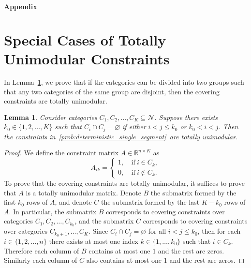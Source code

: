 \documentclass[msom,non-blindrev]{informs3} %
\newtheorem{lemma}[theorem]{Lemma}
\theoremstyle{definition}
\begin{document}

{


%

}

\newpage
\begin{appendices}{\Large \noindent\textbf{Appendix}}

\section{Special Cases of Totally Unimodular Constraints}\label{sec:tu_constraints}

In Lemma~\ref{lemma:tu_constraints}, we prove that if the categories can be divided into two groups such  that any two categories of the same group are disjoint, then the covering constraints are totally unimodular.

\begin{lemma}\label{lemma:tu_constraints}
Consider categories $C_1,C_2,\dots,C_K\subseteq\mathcal{N}$. Suppose there exists $k_0\in\{1,2,\dots,K\}$ such that $C_i\cap C_j=\varnothing$ if either $i<j\leq k_0$ or $k_0<i<j$. Then the constraints in~\eqref{prob:deterministic_single_segment}~are totally unimodular.
\end{lemma}

\begin{proof}
We define the constraint matrix $A\in\mathbb{R}^{n\times K}$ as
\begin{equation*}
A_{ik}=\begin{cases}
1,\ &\text{if}\ i\in C_k,\\
0,\ &\text{if}\ i\notin C_k.
\end{cases}
\end{equation*}
To prove that the covering constraints are totally unimodular, it suffices to prove that $A$ is a totally unimodular matrix. Denote $B$ the submatrix formed by the first $k_0$ rows of $A$, and denote $C$ the submatrix formed by the last $K-k_0$ rows of $A$. In particular, the submatrix $B$ corresponds to covering constraints over categories $C_1,C_2,\dots,C_{k_0}$, and the submatrix $C$ corresponds to covering constraints over categories $C_{k_0+1},\dots,C_K$. Since $C_i\cap C_j=\varnothing$ for all $i<j\leq k_0$, then for each $i\in\{1,2,\dots,n\}$ there exists at most one index $k \in \{1, \ldots, k_0 \}$ such that $i\in C_k$. Therefore each column of $B$ contains at most one $1$ and the rest are zeros. Similarly each column of $C$ also contains at most one $1$ and the rest are zeros. 


\end{proof}
\end{appendices}
\end{document}
